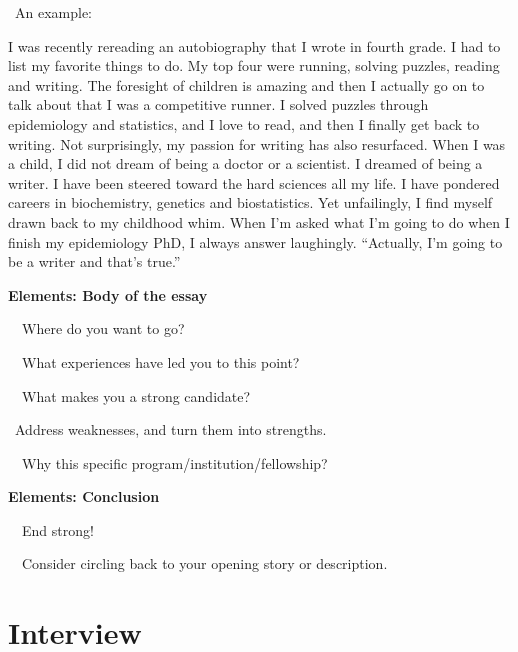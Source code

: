 \documentclass[a4paper, 12pt]{article}
\begin{document}
\newpage\par\textbullet\ An example:
\par I was recently rereading an autobiography that I wrote in fourth grade. I had to list my favorite things to do.
My top four were running, solving puzzles, reading and writing. The foresight of children is amazing and then I actually go on to talk about that I was a competitive runner.
I solved puzzles through epidemiology and statistics, and I love to read, and then I finally get back to writing.
Not surprisingly, my passion for writing has also resurfaced. When I was a child, I did not dream of being a doctor or a scientist.
I dreamed of being a writer. I have been steered toward the hard sciences all my life. I have pondered careers in biochemistry, genetics and biostatistics.
Yet unfailingly, I find myself drawn back to my childhood whim. When I'm asked what I'm going to do when I finish my epidemiology PhD, I always answer laughingly.
``Actually, I'm going to be a writer and that's true.''

\textbf{Elements: Body of the essay}
\par\ \textbullet\ Where do you want to go?
\par\ \textbullet\ What experiences have led you to this point?
\par\ \textbullet\ What makes you a strong candidate?
\par\quad\textopenbullet\ Address weaknesses, and turn them into strengths.
\par\ \textbullet\ Why this specific program/institution/fellowship?

\textbf{Elements: Conclusion}
\par\ \textbullet\ End strong!
\par\ \textbullet\ Consider circling back to your opening story or description.

\newpage\quad

\newpage\section{Interview}
\end{document}
